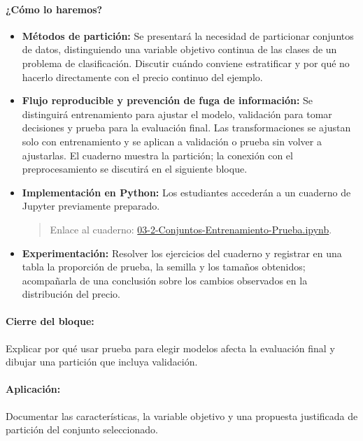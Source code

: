\documentclass[a4,11pt]{aleph-notas}
\begin{document}
\paragraph{¿Cómo lo haremos?}
\begin{itemize}[leftmargin=*]
    \item \textbf{Métodos de partición:}
    Se presentará la necesidad de particionar conjuntos de datos, distinguiendo una variable objetivo continua de las clases de un problema de clasificación. Discutir cuándo conviene estratificar y por qué no hacerlo directamente con el precio continuo del ejemplo.
    \item \textbf{Flujo reproducible y prevención de fuga de información:}
    Se distinguirá entrenamiento para ajustar el modelo, validación para tomar decisiones y prueba para la evaluación final. Las transformaciones se ajustan solo con entrenamiento y se aplican a validación o prueba sin volver a ajustarlas. El cuaderno muestra la partición; la conexión con el preprocesamiento se discutirá en el siguiente bloque.
    \item \textbf{Implementación en Python:} Los estudiantes accederán a un cuaderno de Jupyter previamente preparado.
    \begin{quote}
        Enlace al cuaderno: \href{https://colab.research.google.com/github/andres-merino/AprendizajeAutomaticoInicial-05-N0105/blob/main/2-Notebooks/03-2-Conjuntos-Entrenamiento-Prueba.ipynb}{03-2-Conjuntos-Entrenamiento-Prueba.ipynb}.
    \end{quote}
    \item \textbf{Experimentación:} Resolver los ejercicios del cuaderno y registrar en una tabla la proporción de prueba, la semilla y los tamaños obtenidos; acompañarla de una conclusión sobre los cambios observados en la distribución del precio.

\end{itemize}

\paragraph{Cierre del bloque:} Explicar por qué usar prueba para elegir modelos afecta la evaluación final y dibujar una partición que incluya validación.
\paragraph{Aplicación:} Documentar las características, la variable objetivo y una propuesta justificada de partición del conjunto seleccionado.
\end{document}
